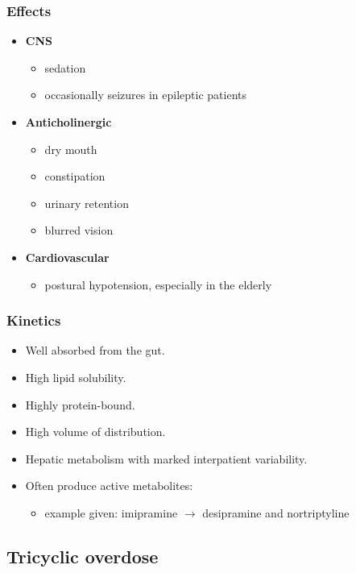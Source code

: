 \documentclass[11pt,a4paper]{article}
\begin{document}
\subsubsection{Effects}
\begin{itemize}
  \item \textbf{CNS}
  \begin{itemize}
    \item sedation
    \item occasionally seizures in epileptic patients
  \end{itemize}
  \item \textbf{Anticholinergic}
  \begin{itemize}
    \item dry mouth
    \item constipation
    \item urinary retention
    \item blurred vision
  \end{itemize}
  \item \textbf{Cardiovascular}
  \begin{itemize}
    \item postural hypotension, especially in the elderly
  \end{itemize}
\end{itemize}

\subsubsection{Kinetics}
\begin{itemize}
  \item Well absorbed from the gut.
  \item High lipid solubility.
  \item Highly protein-bound.
  \item High volume of distribution.
  \item Hepatic metabolism with marked interpatient variability.
  \item Often produce active metabolites:
  \begin{itemize}
    \item example given: imipramine $\rightarrow$ desipramine and nortriptyline
  \end{itemize}
\end{itemize}

\subsection{Tricyclic overdose}
\end{document}
